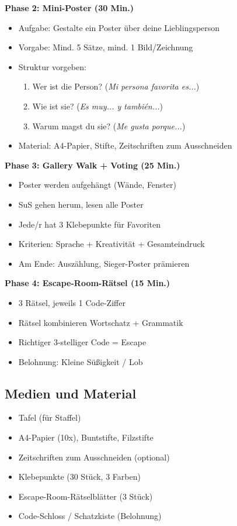 \documentclass[11pt,a4paper]{article}
\begin{document}
\textbf{Phase 2: Mini-Poster (30 Min.)}
\begin{itemize}
    \item Aufgabe: \glqq{}Gestalte ein Poster über deine Lieblingsperson\grqq{}
    \item Vorgabe: Mind. 5 Sätze, mind. 1 Bild/Zeichnung
    \item Struktur vorgeben:
    \begin{enumerate}
        \item Wer ist die Person? (\textit{Mi persona favorita es...})
        \item Wie ist sie? (\textit{Es muy... y también...})
        \item Warum magst du sie? (\textit{Me gusta porque...})
    \end{enumerate}
    \item Material: A4-Papier, Stifte, Zeitschriften zum Ausschneiden
\end{itemize}

\textbf{Phase 3: Gallery Walk + Voting (25 Min.)}
\begin{itemize}
    \item Poster werden aufgehängt (Wände, Fenster)
    \item SuS gehen herum, lesen alle Poster
    \item Jede/r hat 3 Klebepunkte für Favoriten
    \item Kriterien: Sprache + Kreativität + Gesamteindruck
    \item Am Ende: Auszählung, Sieger-Poster prämieren
\end{itemize}

\textbf{Phase 4: Escape-Room-Rätsel (15 Min.)}
\begin{itemize}
    \item 3 Rätsel, jeweils 1 Code-Ziffer
    \item Rätsel kombinieren Wortschatz + Grammatik
    \item Richtiger 3-stelliger Code = \glqq{}Escape\grqq{}
    \item Belohnung: Kleine Süßigkeit / Lob
\end{itemize}

\subsection{Medien und Material}

\begin{itemize}
    \item Tafel (für Staffel)
    \item A4-Papier (10x), Buntstifte, Filzstifte
    \item Zeitschriften zum Ausschneiden (optional)
    \item Klebepunkte (30 Stück, 3 Farben)
    \item Escape-Room-Rätselblätter (3 Stück)
    \item Code-Schloss / Schatzkiste (Belohnung)
\end{itemize}
\end{document}
